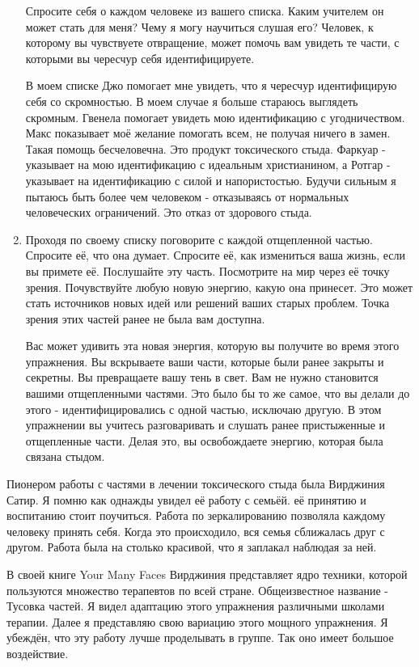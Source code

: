 \documentclass[10pt, fleqn]{article}
\begin{document}
\begin{enumerate}
Спросите себя о каждом человеке из вашего списка. Каким учителем он может стать для меня? Чему я могу научиться слушая его? Человек, к которому вы чувствуете отвращение, может помочь вам увидеть те части, с которыми вы чересчур себя идентифицируете.

В моем списке Джо помогает мне увидеть, что я чересчур идентифицирую себя со скромностью. В моем случае я больше стараюсь выглядеть скромным. Гвенела помогает увидеть мою идентификацию с угодничеством. Макс показывает моё желание помогать всем, не получая ничего в замен. Такая помощь бесчеловечна. Это продукт токсического стыда. Фаркуар - указывает на мою идентификацию с идеальным христианином, а Ротгар - указывает на идентификацию с силой и напористостью. Будучи сильным я пытаюсь быть более чем человеком - отказываясь от нормальных человеческих ограничений. Это отказ от здорового стыда.

\item Проходя по своему списку поговорите с каждой отщепленной частью. Спросите её, что она думает. Спросите её, как измениться ваша жизнь, если вы примете её. Послушайте эту часть. Посмотрите на мир через её точку зрения. Почувствуйте любую новую энергию, какую она принесет. Это может стать источников новых идей или решений ваших старых проблем. Точка зрения этих частей ранее не была вам доступна.

Вас может удивить эта новая энергия, которую вы получите во время этого упражнения. Вы вскрываете ваши части, которые были ранее закрыты и секретны. Вы превращаете вашу тень в свет. Вам не нужно становится вашими отщепленными частями. Это было бы то же самое, что вы делали до этого - идентифицировались с одной частью, исключаю другую. В этом упражнении вы учитесь разговаривать и слушать ранее пристыженные и отщепленные части. Делая это, вы освобождаете энергию, которая была связана стыдом.
\end{enumerate}



Пионером работы с частями в лечении токсического стыда была Вирджиния Сатир. Я помню как однажды увидел её работу с семьёй. её принятию и воспитанию стоит поучиться. Работа по зеркалированию позволяла каждому человеку принять себя. Когда это происходило, вся семья сближалась друг с другом. Работа была на столько красивой, что я заплакал наблюдая за ней.

В своей книге Your Many Faces Вирджиния представляет ядро техники, которой пользуются множество терапевтов по всей стране. Общеизвестное название - Тусовка частей. Я видел адаптацию этого упражнения различными школами терапии. Далее я представляю свою вариацию этого мощного упражнения. Я убеждён, что эту работу лучше проделывать в группе. Так оно имеет большое воздействие.
\end{document}
